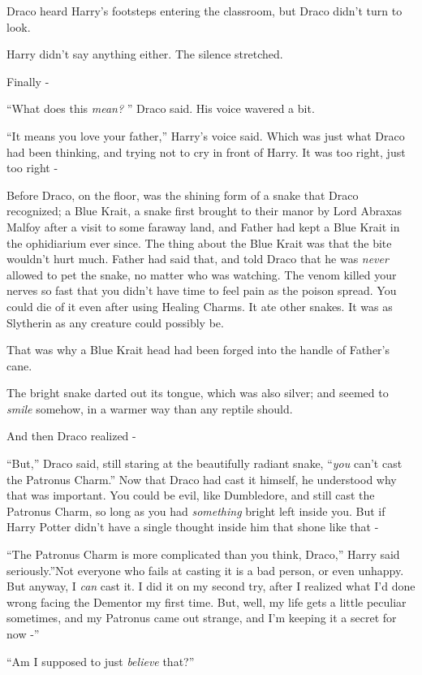 Draco heard Harry's footsteps entering the classroom, but Draco didn't
turn to look.

Harry didn't say anything either. The silence stretched.

Finally -

``What does this \emph{mean?} '' Draco said. His voice wavered a bit.

``It means you love your father,'' Harry's voice said. Which was just
what Draco had been thinking, and trying not to cry in front of Harry.
It was too right, just too right -

Before Draco, on the floor, was the shining form of a snake that Draco
recognized; a Blue Krait, a snake first brought to their manor by Lord
Abraxas Malfoy after a visit to some faraway land, and Father had kept a
Blue Krait in the ophidiarium ever since. The thing about the Blue Krait
was that the bite wouldn't hurt much. Father had said that, and told
Draco that he was \emph{never} allowed to pet the snake, no matter who
was watching. The venom killed your nerves so fast that you didn't have
time to feel pain as the poison spread. You could die of it even after
using Healing Charms. It ate other snakes. It was as Slytherin as any
creature could possibly be.

That was why a Blue Krait head had been forged into the handle of
Father's cane.

The bright snake darted out its tongue, which was also silver; and
seemed to \emph{smile} somehow, in a warmer way than any reptile should.

And then Draco realized -

``But,'' Draco said, still staring at the beautifully radiant snake,
``\emph{you} can't cast the Patronus Charm.'' Now that Draco had cast it
himself, he understood why that was important. You could be evil, like
Dumbledore, and still cast the Patronus Charm, so long as you had
\emph{something} bright left inside you. But if Harry Potter didn't have
a single thought inside him that shone like that -

``The Patronus Charm is more complicated than you think, Draco,'' Harry
said seriously.''Not everyone who fails at casting it is a bad person,
or even unhappy. But anyway, I \emph{can} cast it. I did it on my second
try, after I realized what I'd done wrong facing the Dementor my first
time. But, well, my life gets a little peculiar sometimes, and my
Patronus came out strange, and I'm keeping it a secret for now -''

``Am I supposed to just \emph{believe} that?''

